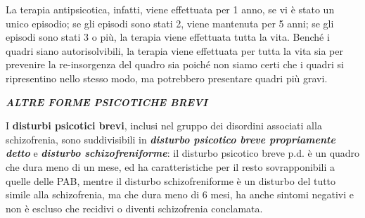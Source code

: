 \documentclass[]{article}
\begin{document}
La terapia antipsicotica, infatti, viene effettuata per 1 anno, se vi è
stato un unico episodio; se gli episodi sono stati 2, viene mantenuta
per 5 anni; se gli episodi sono stati 3 o più, la terapia viene
effettuata tutta la vita. Benché i quadri siano autorisolvibili, la
terapia viene effettuata per tutta la vita sia per prevenire la
re-insorgenza del quadro sia poiché non siamo certi che i quadri si
ripresentino nello stesso modo, ma potrebbero presentare quadri più
gravi.

\textbf{\emph{ALTRE FORME PSICOTICHE BREVI}}

I \textbf{disturbi psicotici brevi}, inclusi nel gruppo dei disordini
associati alla schizofrenia, sono suddivisibili in
\textbf{\emph{disturbo psicotico breve propriamente detto}} e
\textbf{\emph{disturbo schizofreniforme}}: il disturbo psicotico breve
p.d. è un quadro che dura meno di un mese, ed ha caratteristiche per il
resto sovrapponibili a quelle delle PAB, mentre il disturbo
schizofreniforme è un disturbo del tutto simile alla schizofrenia, ma
che dura meno di 6 mesi, ha anche sintomi negativi e non è escluso che
recidivi o diventi schizofrenia conclamata.
\end{document}
